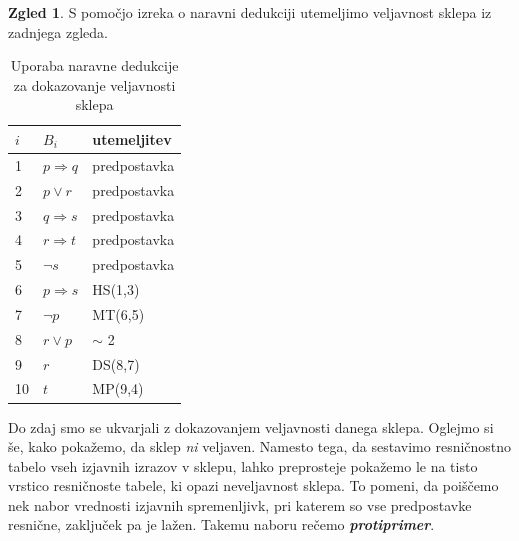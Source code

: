 \documentclass[11pt]{book}
\def\definicija{\color{rdeca}\bf\em}
\theoremstyle{definition}
\theoremstyle{zgled}
\newtheorem*{zgled}{Zgled}
\theoremstyle{odprtproblem}
\theoremstyle{domacanaloga}
\theoremstyle{izrek}
\begin{document}
\begin{zgled}
S pomočjo izreka o naravni dedukciji utemeljimo veljavnost sklepa iz zadnjega zgleda.

\begin{table}[h]
    \centering
    \begin{tabular}{lll}
        $i$ & $B_i$ & utemeljitev \\ \hline
        1 & $p \Rightarrow q$ & predpostavka \\
        2 & $p \lor r$ & predpostavka \\
        3 & $q \Rightarrow s$ & predpostavka \\
        4 & $r \Rightarrow t$ & predpostavka \\
        5 & $\lnot s$ & predpostavka \\
        6 & $p \Rightarrow s$ & HS(1,3) \\
        7 & $\lnot p$ & MT(6,5) \\
        8 & $r \lor p$ & $\sim$ 2 \\
        9 & $r$ & DS(8,7) \\
        10 & \underline{$t$} & MP(9,4) \\
    \end{tabular}
    \caption{Uporaba naravne dedukcije za dokazovanje veljavnosti sklepa}
\end{table}
\end{zgled}

Do zdaj smo se ukvarjali z dokazovanjem veljavnosti danega sklepa. Oglejmo si še, kako pokažemo, da sklep \emph{ni} veljaven. Namesto tega, da sestavimo resničnostno tabelo vseh izjavnih izrazov v sklepu, lahko preprosteje pokažemo le na tisto vrstico resničnoste tabele, ki opazi neveljavnost sklepa. To pomeni, da poiščemo nek nabor vrednosti izjavnih spremenljivk, pri katerem so vse predpostavke resnične, zaključek pa je lažen. Takemu naboru rečemo {\definicija protiprimer}.
\end{document}
